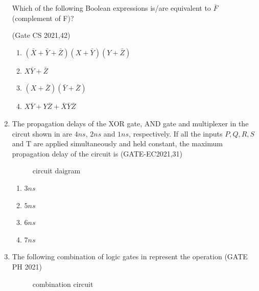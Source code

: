 \begin{enumerate}[label=\arabic*.,ref=\theenumi]
Which of the following Boolean expressions is/are equivalent to $\overline{F}$ (complement of 
 F)?
 
\hfill{(Gate CS 2021,42)}
\begin{enumerate}                                     
\item $(\bar{X}+\bar{Y}+\bar{Z})(X+\bar{Y})(Y+\bar{Z})$
\item $X\bar{Y}+\bar{Z}$
\item $(X+\bar{Z})(\bar{Y}+\bar{Z})$
\item $X\bar{Y}+Y\bar{Z}+\bar{X}\bar{Y}\bar{Z}$ 
\end{enumerate}

    \item The propagation delays of the XOR gate, AND gate and multiplexer  in the circut shown in  
	    are $4 ns$, $2 ns$ and $1 ns$, respectively.
    If all the inputs $P, Q, R, S$ and T are applied simultaneously and held constant, the maximum propagation delay of the circuit is
\hfill(GATE-EC2021,31)  

\begin{figure}[H]
	\resizebox{\columnwidth}{!}{

	}
\caption{circuit daigram} 
\label{fig:block_diagram}
\end{figure}
\begin{enumerate}

    \item $3 ns$
    \item $5 ns$
    \item $6 ns$
    \item $7 ns$
\end{enumerate}
\item  The following combination of logic gates
in
	represent the operation
 \hfill(GATE PH 2021)
	      \begin{figure}[H]
		      \centering
		      \resizebox{\columnwidth}{!}{%
		      
		      }
	              \caption{combination circuit}
		      \label{fig:GATE PH 2021}
	      \end{figure}


\end{enumerate}
